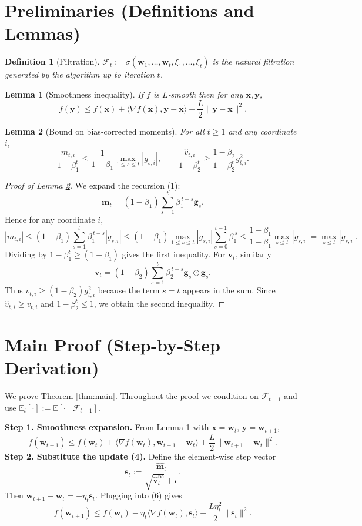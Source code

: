 \documentclass{article}
\newtheorem{lemma}{Lemma}
\newtheorem{definition}{Definition}
\begin{document}
\section*{Preliminaries (Definitions and Lemmas)}
\begin{definition}[Filtration]
$\mathcal{F}_t:=\sigma(\mathbf{w}_1,\dots,\mathbf{w}_t,\xi_1,\dots,\xi_t)$ is the natural filtration generated by the algorithm up to iteration $t$.
\end{definition}
\begin{lemma}[Smoothness inequality]\label{lem:smooth}
If $f$ is $L$‑smooth then for any $\mathbf{x},\mathbf{y}$,
\[
f(\mathbf{y})\le f(\mathbf{x})+\langle\nabla f(\mathbf{x}),\mathbf{y}-\mathbf{x}\rangle
+\frac{L}{2}\|\mathbf{y}-\mathbf{x}\|^2 .
\]
\end{lemma}
\begin{lemma}[Bound on bias‑corrected moments]\label{lem:moment}
For all $t\ge1$ and any coordinate $i$,
\[
\frac{m_{t,i}}{1-\beta_1^t}\le\frac{1}{1-\beta_1}\max_{1\le s\le t}|g_{s,i}|,
\qquad
\frac{\widehat v_{t,i}}{1-\beta_2^t}\ge \frac{1-\beta_2}{1-\beta_2^t} g_{t,i}^2 .
\]
\end{lemma}
\begin{proof}[Proof of Lemma \ref{lem:moment}]
We expand the recursion (1):
\[
\mathbf{m}_t=(1-\beta_1)\sum_{s=1}^{t}\beta_1^{\,t-s}\mathbf{g}_s .
\]
Hence for any coordinate $i$,
\[
|m_{t,i}|\le (1-\beta_1)\sum_{s=1}^{t}\beta_1^{\,t-s}|g_{s,i}|
\le (1-\beta_1)\max_{1\le s\le t}|g_{s,i}|\sum_{s=0}^{t-1}\beta_1^{\,s}
\le \frac{1-\beta_1}{1-\beta_1}\max_{s\le t}|g_{s,i}|
= \max_{s\le t}|g_{s,i}|.
\]
Dividing by $1-\beta_1^t\ge (1-\beta_1)$ gives the first inequality.
For $\mathbf{v}_t$, similarly
\[
\mathbf{v}_t=(1-\beta_2)\sum_{s=1}^{t}\beta_2^{\,t-s}\mathbf{g}_s\odot\mathbf{g}_s .
\]
Thus $v_{t,i}\ge (1-\beta_2)g_{t,i}^2$ because the term $s=t$ appears in the sum.
Since $\widehat v_{t,i}\ge v_{t,i}$ and $1-\beta_2^t\le 1$, we obtain the second inequality. \qedhere
\end{proof}

\section*{Main Proof (Step‑by‑Step Derivation)}
We prove Theorem \ref{thm:main}. Throughout the proof we condition on $\mathcal{F}_{t-1}$ and use $\mathbb{E}_t[\cdot]:=\mathbb{E}[\cdot\mid\mathcal{F}_{t-1}]$.

\noindent\textbf{Step 1. Smoothness expansion.}  
From Lemma \ref{lem:smooth} with $\mathbf{x}=\mathbf{w}_t$, $\mathbf{y}=\mathbf{w}_{t+1}$,
\[
f(\mathbf{w}_{t+1})\le f(\mathbf{w}_t)
+\langle\nabla f(\mathbf{w}_t),\mathbf{w}_{t+1}-\mathbf{w}_t\rangle
+\frac{L}{2}\|\mathbf{w}_{t+1}-\mathbf{w}_t\|^2 .
\tag{6}
\]
\noindent\textbf{Step 2. Substitute the update (4).}  
Define the element‑wise step vector
\[
\mathbf{s}_t:=\frac{\widehat{\mathbf{m}}_t}{\sqrt{\widehat{\mathbf{v}}_t^{\mathrm{bc}}}+\epsilon}.
\]
Then $\mathbf{w}_{t+1}-\mathbf{w}_t=-\eta_t\mathbf{s}_t$. Plugging into (6) gives
\[
f(\mathbf{w}_{t+1})\le f(\mathbf{w}_t)-\eta_t\langle\nabla f(\mathbf{w}_t),\mathbf{s}_t\rangle
+\frac{L\eta_t^{2}}{2}\|\mathbf{s}_t\|^2 .
\tag{7}
\]
\end{document}
